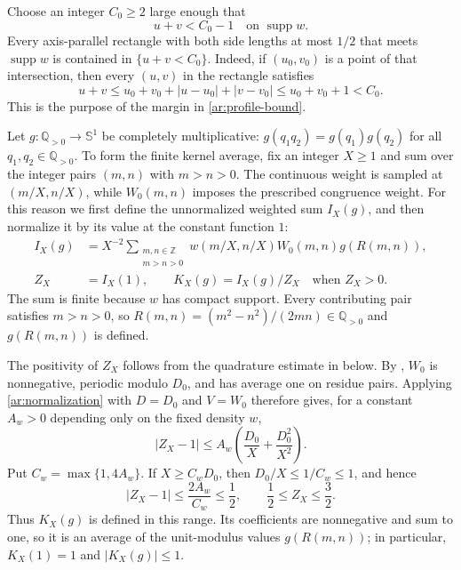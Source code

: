 \documentclass[twoside]{aomart}
\theoremstyle{paperplain}
\theoremstyle{paperdefinition}
\newcommand{\Z}{\mathbb Z}
\newcommand{\Q}{\mathbb Q}
\numberwithin{equation}{section}
\begin{document}
Choose an integer $C_0\ge2$ large enough that
\begin{equation}
 u+v<C_0-1\quad\text{on }\operatorname{supp}w.
 \label{ar:profile-bound}
\end{equation}
Every axis-parallel rectangle with both side lengths at most
$1/2$ that meets $\operatorname{supp}w$ is contained in
$\{u+v<C_0\}$. Indeed, if $(u_0,v_0)$ is a point of that
intersection, then every $(u,v)$ in the rectangle satisfies
\begin{equation*}
 u+v\le u_0+v_0+|u-u_0|+|v-v_0|
      \le u_0+v_0+1<C_0.
\end{equation*}
This is the purpose of the margin in \eqref{ar:profile-bound}.

Let $g:\Q_{>0}\to\mathbb S^1$ be completely multiplicative:
$g(q_1q_2)=g(q_1)g(q_2)$ for all $q_1,q_2\in\Q_{>0}$.
To form the finite kernel average, fix an integer $X\ge1$ and sum over
the integer pairs $(m,n)$ with $m>n>0$.  The continuous weight is sampled
at $(m/X,n/X)$, while $W_0(m,n)$ imposes the prescribed congruence weight.
For this reason we first define the unnormalized weighted sum
$I_X(g)$, and then normalize it by its value at the constant function
$1$:
\begin{equation}
 \begin{aligned}
 I_X(g)&=X^{-2}\sum_{\substack{m,n\in\Z\\m>n>0}}
    w(m/X,n/X)W_0(m,n)g(R(m,n)),\\
 Z_X&=I_X(1),\qquad K_X(g)=I_X(g)/Z_X
       \quad\text{when }Z_X>0.
 \end{aligned}
 \label{ar:kernel}
\end{equation}
The sum is finite because $w$ has compact support.
Every contributing pair satisfies $m>n>0$, so
$R(m,n)=(m^2-n^2)/(2mn)\in\Q_{>0}$ and $g(R(m,n))$ is defined.

The positivity of $Z_X$ follows from the quadrature estimate
in  below. By ,
$W_0$ is nonnegative, periodic modulo $D_0$, and has average
one on residue pairs. Applying \eqref{ar:normalization} with
$D=D_0$ and $V=W_0$ therefore gives, for a constant $A_w>0$
depending only on the fixed density $w$,
\begin{equation*}
 |Z_X-1|\le A_w\left(\frac{D_0}{X}+\frac{D_0^2}{X^2}\right).
\end{equation*}
Put $C_w=\max\{1,4A_w\}$. If $X\ge C_wD_0$, then
$D_0/X\le1/C_w\le1$, and hence
\begin{equation*}
 |Z_X-1|\le\frac{2A_w}{C_w}\le\frac12,
 \qquad \frac12\le Z_X\le\frac32.
\end{equation*}
Thus $K_X(g)$ is defined in this range. Its coefficients are
nonnegative and sum to one, so it is an average of the
unit-modulus values $g(R(m,n))$; in particular,
$K_X(1)=1$ and $|K_X(g)|\le1$.
\end{document}
